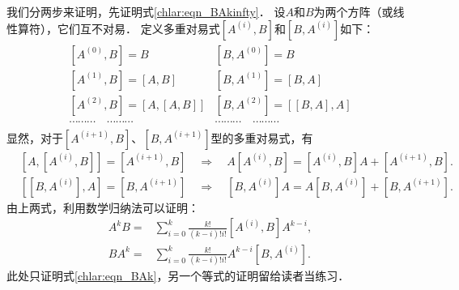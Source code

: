 我们分两步来证明，先证明式\eqref{chlar:eqn_BAkinfty}．
设$A$和$B$为两个方阵（或线性算符），它们互不对易．
定义多重对易式$\left[A^{(i)}, B\right]$和$\left[B, A^{(i)}\right]$如下：
\begin{align*}
\begin{array}{ll}
	{\left[A^{(0)}, B\right]=B} & {\left[B, A^{(0)}\right]=B} \\
	{\left[A^{(1)}, B\right]=[A, B]} & {\left[B, A^{(1)}\right]=[B, A]} \\
	{\left[A^{(2)}, B\right]=[A,[A, B]]} & {\left[B, A^{(2)}\right]=[[B, A], A]} \\
	\cdots\cdots\cdots \quad \cdots\cdots\cdots & \cdots\cdots\cdots \quad \cdots\cdots\cdots
\end{array}
\end{align*}
显然，对于$\left[A^{(i+1)}, B\right]$、$\left[B, A^{(i+1)}\right]$型的多重对易式，有
\begin{align*}
	&\left[A,\left[A^{(i)}, B\right]\right]=\left[A^{(i+1)}, B\right]
	\quad \Rightarrow \quad
	A\left[A^{(i)}, B\right]=\left[A^{(i)}, B\right] A+\left[A^{(i+1)}, B\right] . \\
	&\left[\left[B, A^{(i)}\right], A\right] = \left[B, A^{(i+1)}\right]
	\quad \Rightarrow \quad
	\left[B, A^{(i)}\right] A = A \left[B, A^{(i)}\right] + \left[B, A^{(i+1)}\right] .
\end{align*}
由上两式，利用数学归纳法可以证明：
\begin{subequations}\label{chlar:eqn_AkBAk}
\begin{align}
	A^k B= & \sum\nolimits_{i=0}^k \frac{k!}{(k-i)!i!}\left[A^{(i)}, B\right] A^{k-i}, \label{chlar:eqn_AkB} \\
	B A^k= & \sum\nolimits_{i=0}^k \frac{k!}{(k-i)!i!} A^{k-i}\left[B, A^{(i)}\right] . \label{chlar:eqn_BAk}
\end{align}
\end{subequations}
此处只证明式\eqref{chlar:eqn_BAk}，另一个等式的证明留给读者当练习．

